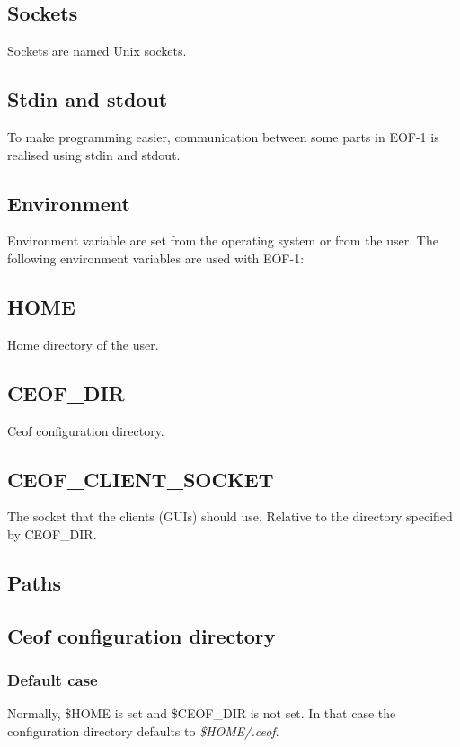 \documentclass[12pt,a4paper]{book}
\begin{document}
\subsection{Sockets}
Sockets are named Unix sockets.
\subsection{Stdin  and stdout}
To make programming easier, communication between some parts in EOF-1 is realised
using stdin and stdout. 
\subsection{Environment}
Environment variable are set from the operating system or from the user.
The following environment variables are used with EOF-1:
\subsection{HOME}
Home directory of the user.
\subsection{CEOF\_DIR}
Ceof configuration directory.
\subsection{CEOF\_CLIENT\_SOCKET}
The socket that the clients (GUIs) should use.
Relative to the directory specified by CEOF\_DIR.
\subsection{Paths}
\subsection{Ceof configuration directory}
\subsubsection{Default case}
Normally, \$HOME is set and \$CEOF\_DIR is not set. In that case
the configuration directory defaults to \textit{\$HOME/.ceof}.
\end{document}
